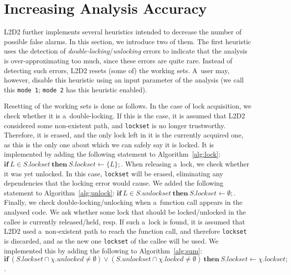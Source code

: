 \documentclass[runningheads]{llncs}
\newcommand{\LLDD}{\textsc{L2D2}\xspace} %
\newcommand{\mOne}{\texttt{mode\,1}\xspace}
\newcommand{\mTwo}{\texttt{mode\,2}\xspace}
\begin{document}
\vspace*{-4mm}\section{Increasing Analysis Accuracy}\vspace*{-2mm}
\label{sec:heuristics}

\LLDD further implements several heuristics intended to decrease the number
of possible false alarms. In this section, we introduce two of them. The
first heuristic uses the detection of \emph{double-locking}/\emph{unlocking}
errors to indicate that the analysis is over-approximating too much, since
these errors are quite rare. Instead of detecting such errors, \LLDD resets
(some of) the working sets. A~user may, however, disable this heuristic using
an input parameter of the analysis (we call this \mOne; \mTwo has this
heuristic enabled).

Resetting of the working sets is done as follows. In the case of lock
acquisition, we check whether it is a~double-locking. If this is the case,
it is assumed that \LLDD considered some non-existent path, and
\texttt{lockset} is no longer trustworthy. Therefore, it is erased, and the
only lock left in it is the currently acquired one, as this is the only one
about which we can safely say it is locked. It is implemented by adding
the following statement to Algorithm~\ref{alg:lock}: $ \mathbf{if} \ L \in
S.lockset \ \mathbf{then} \ S.lockset \gets \{L\}; $. When releasing
a~lock, we check whether it was yet unlocked. In this case,
\texttt{lockset} will be erased, eliminating any dependencies that
the locking error would cause. We added the following statement to
Algorithm~\ref{alg:unlock}: $ \mathbf{if} \ L \in S.unlockset \
\mathbf{then} \ S.lockset \gets \emptyset; $. Finally, we check
double-locking/unlocking when a~function call appears in the analysed code.
We ask whether some lock that should be locked/unlocked in the callee is
currently released/held, resp. If such a~lock is found, it is assumed that
\LLDD used a~non-existent path to reach the function call, and therefore
\texttt{lockset} is discarded, and as the new one \texttt{lockset} of the
callee will be used. We implemented this by adding the following to
Algorithm~\ref{alg:sum}: $ \mathbf{if} \ (S.lockset \cap \chi.unlocked \neq
\emptyset) \vee (S.unlockset \cap \chi.locked \neq \emptyset) \
\mathbf{then} \ S.lockset \gets \chi.lockset; $.
\end{document}
